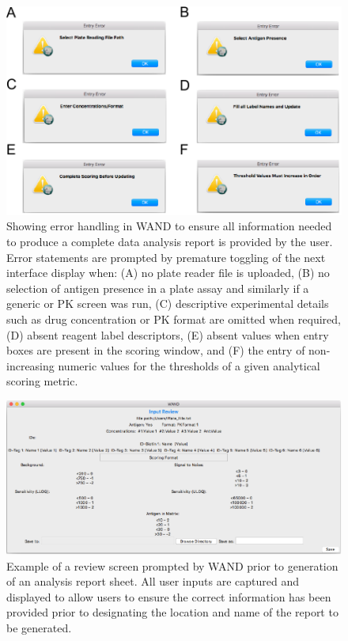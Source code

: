 \begin{figure}[ht]
 \centering
 \includegraphics{graphics/ch3/Figure_S2.pdf}
 \caption{Showing error handling in WAND to ensure all information needed to produce a complete data analysis report is provided by the user.  Error statements are prompted by premature toggling of the next interface display when: (A) no plate reader file is uploaded, (B) no selection of antigen presence in a plate assay and similarly if a generic or PK screen was run, (C) descriptive experimental details such as drug concentration or PK format are omitted when required, (D) absent reagent label descriptors, (E) absent values when entry boxes are present in the scoring window, and (F) the entry of non-increasing numeric values for the thresholds of a given analytical scoring metric.}
 \end{figure}

\begin{figure}[ht]
 \centering
 \includegraphics{graphics/ch3/Figure_S3.pdf}
 \caption{Example of a review screen prompted by WAND prior to generation of an analysis report sheet.  All user inputs are captured and displayed to allow users to ensure the correct information has been provided prior to designating the location and name of the report to be generated.}
 \end{figure}

